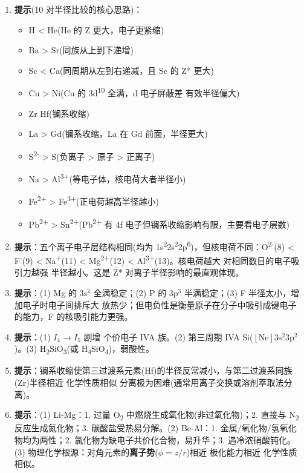 \begin{enumerate}
\def\labelenumi{\arabic{enumi}.}
\setcounter{enumi}{4}
\item
  \textbf{提示}(10 对半径比较的核心思路)：

  \begin{itemize}
  \tightlist
  \item
    H \textless{} He(He 的 Z 更大，电子更紧缩)
  \item
    Ba \textgreater{} Sr(同族从上到下递增)
  \item
    Sc \textless{} Ca(同周期从左到右递减，且 Sc 的 Z* 更大)
  \item
    Cu \textgreater{} Ni(Cu 的 3d\textsuperscript{10} 全满，d 电子屏蔽差 \箭 有效半径偏大)
  \item
    Zr  Hf(镧系收缩)
  \item
    La \textgreater{} Gd(镧系收缩，La 在 Gd 前面，半径更大)
  \item
    S\textsuperscript{2-} \textgreater{} S(负离子 \textgreater{} 原子 \textgreater{} 正离子)
  \item
    Na \textgreater{} Al\textsuperscript{3+}(等电子体，核电荷大者半径小)
  \item
    Fe\textsuperscript{2+} \textgreater{} Fe\textsuperscript{3+}(正电荷越高半径越小)
  \item
    Pb\textsuperscript{2+} \textgreater{} Sn\textsuperscript{2+}(Pb\textsuperscript{2+} 有 4f 电子但镧系收缩影响有限，主要看电子层数)
  \end{itemize}
\item
  \textbf{提示}：五个离子电子层结构相同(均为 1s\textsuperscript{2}2s\textsuperscript{2}2p\textsuperscript{6})，但核电荷不同：O\textsuperscript{2-}(8) \textless{} F\textsuperscript{-}(9) \textless{} Na\textsuperscript{+}(11) \textless{} Mg\textsuperscript{2+}(12) \textless{} Al\textsuperscript{3+}(13)。核电荷越大 \箭 对相同数目的电子吸引力越强 \箭 半径越小。这是 Z* 对离子半径影响的最直观体现。
\item
  \textbf{提示}：(1) Mg 的 \(3\mathrm{s}^2\) 全满稳定；(2) P 的 \(3\mathrm{p}^3\) 半满稳定；(3) F 半径太小，增加电子时电子间排斥大 \箭 放热少；但电负性是衡量原子在分子中吸引成键电子的能力，F 的核吸引能力更强。
\item
  \textbf{提示}：(1) \(I_4\to I_5\) 剧增  个价电子 \箭 IVA 族。(2) 第三周期 IVA \箭 Si(\([\mathrm{Ne}] 3\mathrm{s}^2 3\mathrm{p}^2\))。(3) H\textsubscript{2}SiO\textsubscript{3}(或 H\textsubscript{4}SiO\textsubscript{4})，弱酸性。
\item
  \textbf{提示}：镧系收缩使第三过渡系元素(Hf)的半径反常减小，与第二过渡系同族(Zr)半径相近 \箭 化学性质相似 \箭 分离极为困难(通常用离子交换或溶剂萃取法分离)。
\item
  \textbf{提示}：(1) Li-Mg：1. 过量 O\textsubscript{2} 中燃烧生成氧化物(非过氧化物)；2. 直接与 N\textsubscript{2} 反应生成氮化物；3. 碳酸盐受热易分解。(2) Be-Al：1. 金属/氧化物/氢氧化物均为两性；2. 氯化物为缺电子共价化合物，易升华；3. 遇冷浓硝酸钝化。(3) 物理化学根源：对角元素的\textbf{离子势}(\(\phi = z/r\))相近 \箭 极化能力相近 \箭 化学性质相似。
\end{enumerate}

